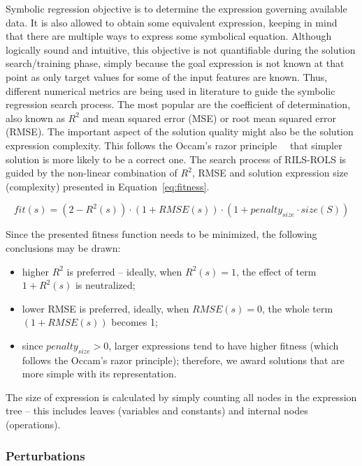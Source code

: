 \documentclass[a4paper,12pt]{elsarticle}
\begin{document}
Symbolic regression objective is to determine the expression governing available data. It is also allowed to obtain some equivalent expression, keeping in mind that there are multiple ways to express some symbolical equation. Although logically sound and intuitive, this objective is not quantifiable during the solution search/training phase, simply because the goal expression is not known at that point as only target values for some of the input features are known. Thus, different numerical metrics are being used in literature to guide the symbolic regression search process. The most popular are the coefficient of determination, also known as $R^2$ and mean squared error (MSE) or root mean squared error (RMSE). The important aspect of the solution quality might also be the solution expression complexity. This follows the Occam's razor principle~\cite{costa2020fast}~ that simpler solution  is more likely to be a correct one. 
The search process of RILS-ROLS is guided by the non-linear combination of $R^2$, RMSE and solution expression size (complexity) presented in Equation~\ref{eq:fitness}. 

\begin{equation}
	\label{eq:fitness}
	fit(s) = (2-R^2(s)) \cdot (1+RMSE(s)) \cdot (1+penalty_{size} \cdot size(S))
\end{equation}

Since the presented fitness function needs to be minimized, the following conclusions may be drawn:
\begin{itemize}
	\item higher $R^2$ is preferred -- ideally, when $R^2(s)=1$, the effect of term $1+R^2(s)$ is neutralized; %
	\item lower RMSE is preferred, ideally, when $RMSE(s)=0$, the whole term $(1+RMSE(s))$ becomes 1;
	\item since $penalty_{size} > 0$, larger expressions tend to have higher fitness (which follows the Occam's razor principle); therefore, we award solutions that are more simple with its representation. 
\end{itemize}

The size of expression is calculated by simply counting all nodes in the expression tree -- this includes leaves (variables and constants) and internal nodes (operations). 

\subsubsection{Perturbations}\label{sec:pertGen}
\end{document}
